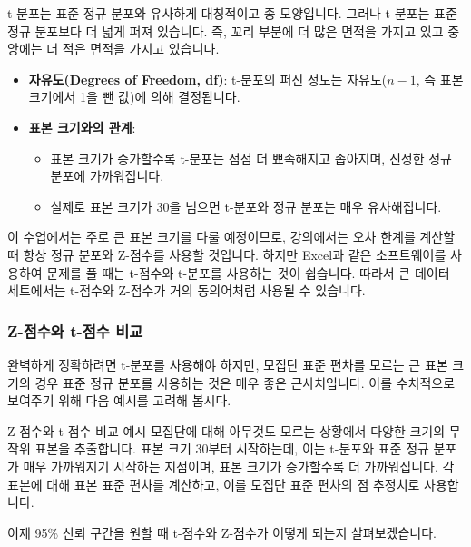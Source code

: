 \documentclass[11pt,a4paper]{article}
\begin{document}
t-분포는 표준 정규 분포와 유사하게 대칭적이고 종 모양입니다. 그러나 t-분포는 표준 정규 분포보다 더 넓게 퍼져 있습니다. 즉, 꼬리 부분에 더 많은 면적을 가지고 있고 중앙에는 더 적은 면적을 가지고 있습니다.

\begin{itemize}
    \item \textbf{자유도(Degrees of Freedom, df)}: t-분포의 퍼진 정도는 자유도($n-1$, 즉 표본 크기에서 1을 뺀 값)에 의해 결정됩니다.
    \item \textbf{표본 크기와의 관계}:
    \begin{itemize}
        \item 표본 크기가 증가할수록 t-분포는 점점 더 뾰족해지고 좁아지며, 진정한 정규 분포에 가까워집니다.
        \item 실제로 표본 크기가 30을 넘으면 t-분포와 정규 분포는 매우 유사해집니다.
    \end{itemize}
\end{itemize}
이 수업에서는 주로 큰 표본 크기를 다룰 예정이므로, 강의에서는 오차 한계를 계산할 때 항상 정규 분포와 Z-점수를 사용할 것입니다. 하지만 Excel과 같은 소프트웨어를 사용하여 문제를 풀 때는 t-점수와 t-분포를 사용하는 것이 쉽습니다. 따라서 큰 데이터 세트에서는 t-점수와 Z-점수가 거의 동의어처럼 사용될 수 있습니다.

\subsubsection*{Z-점수와 t-점수 비교}
완벽하게 정확하려면 t-분포를 사용해야 하지만, 모집단 표준 편차를 모르는 큰 표본 크기의 경우 표준 정규 분포를 사용하는 것은 매우 좋은 근사치입니다. 이를 수치적으로 보여주기 위해 다음 예시를 고려해 봅시다.

\begin{examplebox}{Z-점수와 t-점수 비교 예시}
모집단에 대해 아무것도 모르는 상황에서 다양한 크기의 무작위 표본을 추출합니다. 표본 크기 30부터 시작하는데, 이는 t-분포와 표준 정규 분포가 매우 가까워지기 시작하는 지점이며, 표본 크기가 증가할수록 더 가까워집니다. 각 표본에 대해 표본 표준 편차를 계산하고, 이를 모집단 표준 편차의 점 추정치로 사용합니다.

이제 95\% 신뢰 구간을 원할 때 t-점수와 Z-점수가 어떻게 되는지 살펴보겠습니다.
\end{examplebox}
\end{document}
